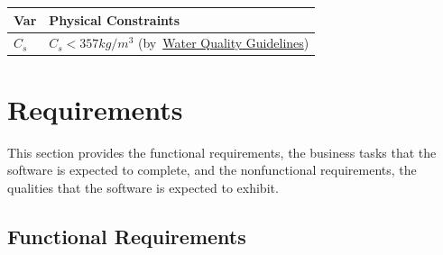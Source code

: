 \documentclass[12pt]{article}
\begin{document}
\begin{table}[!h]
\caption{Output Variables} \label{TblOutputVar}
\renewcommand{\arraystretch}{1.2}
\noindent \begin{longtable*}{l l} 
  \toprule
  \textbf{Var} & \textbf{Physical Constraints} \\
  \midrule 
  $C_s$ & $C_s < 357 kg/m^3$ (by~\href{https://www2.gov.bc.ca/assets/gov/environment/air-land-water/water/waterquality/water-quality-guidelines/approved-wqgs/chloride-or.pdf}{Water Quality Guidelines}) \\
  
   \bottomrule
\end{longtable*}
\end{table}


\section{Requirements}


This section provides the functional requirements, the business tasks that the
software is expected to complete, and the nonfunctional requirements, the
qualities that the software is expected to exhibit.

\indent 
\newpage
\subsection{Functional Requirements}
\end{document}
